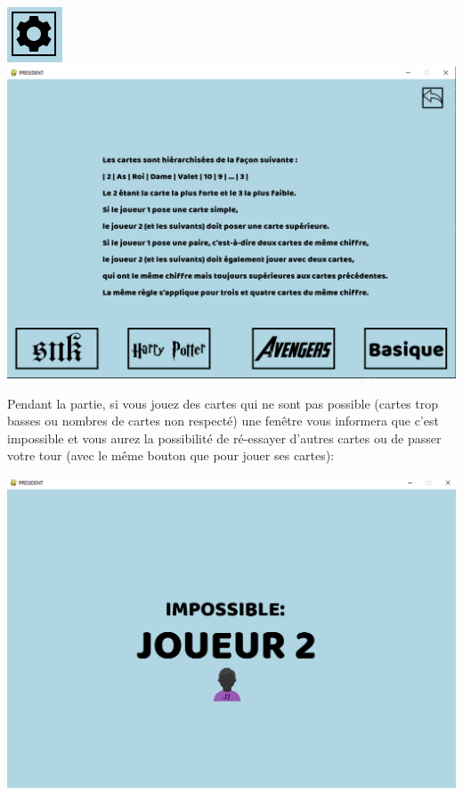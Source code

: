 \documentclass[french,12pt]{article}
\begin{document}
\begin{center}
	\includegraphics[scale=1.0]{img/parametres.png}\\
	\includegraphics[scale=0.3]{img/regles.png}
\end{center}

Pendant la partie, si vous jouez des cartes qui ne sont pas possible (cartes trop basses ou nombres de cartes non respecté) une fenêtre vous informera que c'est impossible et vous aurez la possibilité de ré-essayer d'autres cartes ou de passer votre tour (avec le même bouton que pour jouer ses cartes):

\begin{center}
	\includegraphics[scale=0.3]{img/impossible.png}
\end{center}
\end{document}
